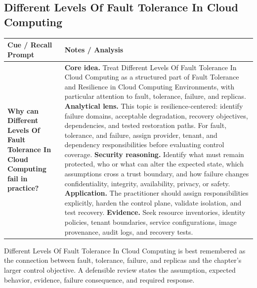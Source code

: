 \documentclass[11pt]{article}
\newcommand{\CornellHeader}{%
\rowcolor{Navy}\color{white}\bfseries Cue / Recall Prompt & \color{white}\bfseries Notes / Analysis\\\hline}
\newcommand{\CornellRow}[2]{%
\cellcolor{CueGray}\RaggedRight\textbf{#1} & \RaggedRight #2\\\hline}
\begin{document}
\subsection*{Different Levels Of Fault Tolerance In Cloud Computing}
\begin{longtable}{>{\RaggedRight\arraybackslash}p{}|>{\RaggedRight\arraybackslash}p{}}
\CornellHeader
\CornellRow{Why can Different Levels Of Fault Tolerance In Cloud Computing fail in practice?}{\textbf{Core idea.} Treat Different Levels Of Fault Tolerance In Cloud Computing as a structured part of Fault Tolerance and Resilience in Cloud Computing Environments, with particular attention to fault, tolerance, failure, and replicas. \textbf{Analytical lens.} This topic is resilience-centered: identify failure domains, acceptable degradation, recovery objectives, dependencies, and tested restoration paths. For fault, tolerance, and failure, assign provider, tenant, and dependency responsibilities before evaluating control coverage. \textbf{Security reasoning.} Identify what must remain protected, who or what can alter the expected state, which assumptions cross a trust boundary, and how failure changes confidentiality, integrity, availability, privacy, or safety. \textbf{Application.} The practitioner should assign responsibilities explicitly, harden the control plane, validate isolation, and test recovery. \textbf{Evidence.} Seek resource inventories, identity policies, tenant boundaries, service configurations, image provenance, audit logs, and recovery tests.}
\end{longtable}
\begin{topicsummary}
Different Levels Of Fault Tolerance In Cloud Computing is best remembered as the connection between fault, tolerance, failure, and replicas and the chapter's larger control objective. A defensible review states the assumption, expected behavior, evidence, failure consequence, and required response.
\end{topicsummary}
\end{document}
